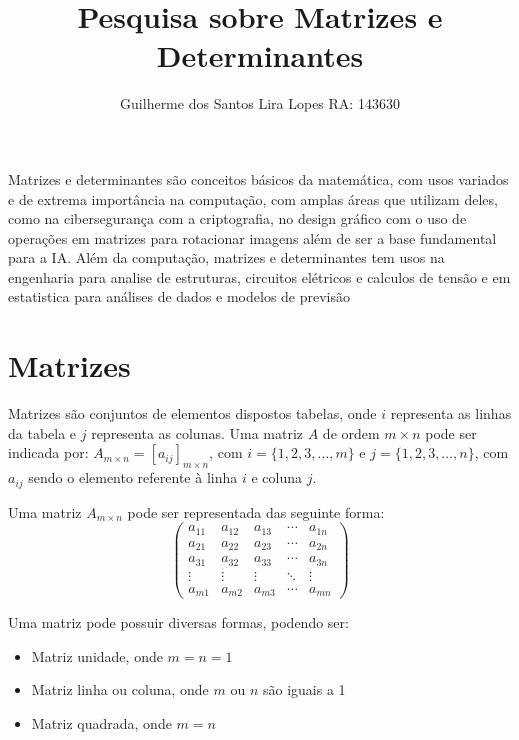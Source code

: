 \documentclass[12pt]{article}
\title{Pesquisa sobre Matrizes e Determinantes}
\author{Guilherme dos Santos Lira Lopes RA: 143630}
\begin{document}
\maketitle

\vspace{16pt}

Matrizes e determinantes são conceitos básicos da matemática, com usos variados 
e de extrema importância na computação, com amplas áreas que utilizam deles, 
como na cibersegurança com a criptografia, no design gráfico com o uso de 
operações em matrizes para rotacionar imagens além de ser a base fundamental 
para a IA. Além da computação, matrizes e determinantes tem usos na engenharia 
para analise de estruturas, circuitos elétricos e calculos de tensão e em 
estatistica para análises de dados e modelos de previsão


\section{Matrizes}
Matrizes são conjuntos de elementos dispostos tabelas, onde $i$ representa 
as linhas da tabela e $j$ representa as colunas. Uma matriz $A$ de ordem 
$m\times n$ pode ser indicada por: $A_{m\times n} = [a_{ij}]_{m\times n}$, 
com $i = \{1, 2, 3, \ldots, m\}$ e $j = \{1, 2, 3, \ldots, n\}$, com $a_{ij}$
sendo o elemento referente à linha $i$ e coluna $j$.

Uma matriz $A_{m\times n}$ pode ser representada das seguinte forma:
\[
\begin{pmatrix}
    a_{11} & a_{12} & a_{13} & \cdots & a_{1n} \\
    a_{21} & a_{22} & a_{23} & \cdots & a_{2n} \\
    a_{31} & a_{32} & a_{33} & \cdots & a_{3n} \\
    \vdots & \vdots & \vdots & \ddots & \vdots \\
    a_{m1} & a_{m2} & a_{m3} & \cdots & a_{mn}
\end{pmatrix}
\]

Uma matriz pode possuir diversas formas, podendo ser:
\begin{itemize}
    \item Matriz unidade, onde $m=n=1$
    \item Matriz linha ou coluna, onde $m$ ou $n$ são iguais a 1
    \item Matriz quadrada, onde $m=n$
\end{itemize} 

\vspace{16pt}
\end{document}
